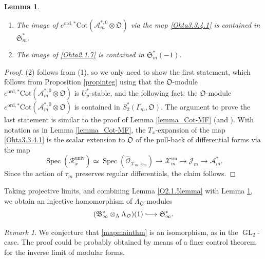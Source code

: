 \documentclass[a4paper,11pt]{amsart}
\numberwithin{equation}{section}
\theoremstyle{plain}
\newtheorem{lemma}[theorem]{Lemma}
\theoremstyle{definition}
\theoremstyle{remark}
\newtheorem{remark}[theorem]{Remark}
\DeclareMathOperator{\Spec}{Spec}
\DeclareMathOperator{\GL}{GL}
\newcommand{\ord}{\mathrm{ord}}
\newcommand{\Cot}{\mathrm{Cot}}
\newcommand{\longmono}{\mbox{\;$\lhook\joinrel\longrightarrow$\;}}
\begin{document}
{
\begin{lemma}\label{lemmaintegral} 
\begin{enumerate}
\item The image of $e^{\ord,*}\Cot(\mathcal{A}_m^{*,0}\otimes\mathfrak{O})$ via the map \eqref{Ohta3.3.4.1} is contained in $\mathfrak{S}_m^*$. 
\item The image of  
\eqref{Ohta2.1.7} is contained in $\mathfrak{S}_m^*(-1)$. 
\end{enumerate}
\end{lemma}

\begin{proof}
(2) follows from (1), so we only need to show the first statement, which follows  
from Proposition \ref{propinteg} using that the $\mathfrak{O}$-module 
$e^{\ord,*}\Cot(\mathcal{A}_m^{*,0}\otimes\mathfrak{O})$ 
is $U_p^*$-stable, and the following fact: 
the $\mathfrak{O}$-module 
$e^{\ord,*}\Cot(\mathcal{A}_m^{*,0}\otimes\mathfrak{O})$ is contained in $S_2^*(\Gamma_m,\mathfrak{O})$. The argument to prove the last statement is similar to the proof of Lemma \ref{lemma_Cot-MF}
(and \cite[Proposition (3.3.6)]{Ohta-ES}). 
With notation as in  Lemma \ref{lemma_Cot-MF}, 
  the $T_x$-expansion of the map \eqref{Ohta3.3.4.1} is the scalar extension to $\mathfrak{O}$ of the pull-back of differential forms via the map 
\[\Spec(\mathcal{R}_x^\mathrm{univ})\simeq\Spec(\widehat{\mathcal{O}}_{\mathcal{X}_{m},x_m})\longrightarrow
\mathcal{X}_m^\mathrm{sm}\longrightarrow\mathcal{J}_m\rightarrow\mathcal{A}_m^*.\] 
Since the action of $\tau_m$ preserves regular differentials, the claim follows. 
\end{proof}

Taking projective limits, and combining Lemma \ref{O2.1.5lemma} with Lemma \ref{lemmaintegral}, 
{we obtain an injective homomorphism of $\Lambda_\mathfrak{O}$-modules} 
\begin{equation}\label{mapmainthm}
(\mathfrak{B}_\infty^*\otimes_{\Lambda}\Lambda_\mathfrak{O})(1)\longmono \mathfrak{S}_\infty^*. 
\end{equation}

\begin{remark}\label{remiso}
    We conjecture that \eqref{mapmainthm} is an isomorphism, as in the $\GL_2$-case. The proof could be probably obtained by means of a finer control theorem for the inverse limit of modular forms. 
\end{remark}

}
\end{document}
